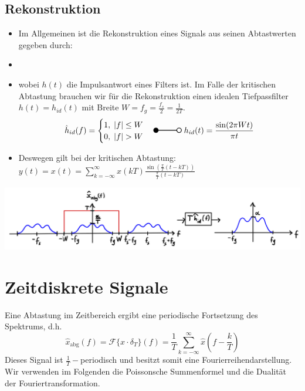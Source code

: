 \documentclass[11pt]{article}
\newcommand{\invtransform}[2]{%
    \begin{tikzpicture}
        \filldraw[thick] (0,0) circle (0.1);
        \draw[thick] (0.1,0) -- (#2 -0.1,0) node[midway, above] {#1};
        \draw[thick] (#2,0) circle (0.1);
    \end{tikzpicture}%
}
\begin{document}
\subsection*{Rekonstruktion}
\begin{itemize}[leftmargin=0pt]
    \item[] Im Allgemeinen ist die Rekonstruktion eines Signals aus seinen Abtastwerten gegeben durch:
    \item[] 
    \item[] wobei $h(t)$ die Impulsantwort eines Filters ist. Im Falle der kritischen Abtastung brauchen wir für die Rekonstruktion einen idealen Tiefpassfilter $h(t) = h_{id}(t)$ mit Breite $W = f_g = \frac{f_s}{2} = \frac{1}{2T}$.
    $$\hat{h}_{id}(f) = \displaystyle\begin{cases}
        1, \; |f| \leq W \\
        0, \; |f| > W
    \end{cases} \invtransform{}{1} \; h_{id}(t)=\displaystyle\frac{\sin(2 \pi W t)}{\pi t}$$
    \item[] Deswegen gilt bei der kritischen Abtastung: $y(t) = x(t) = \displaystyle\sum_{k=-\infty}^\infty x(kT)\displaystyle\frac{\sin\left(\frac{\pi}{T}(t-kT)\right)}{\frac{\pi}{T}(t-kT)}$
\end{itemize}
\vspace*{-0.75cm}
\begin{center}
    \includegraphics[width=\linewidth]{docimgs/filtering1.jpg}
\end{center}

\vfill \null
\pagebreak

\section*{Zeitdiskrete Signale}
\vspace*{-0.5cm}
Eine Abtastung im Zeitbereich ergibt eine periodische Fortsetzung des Spektrums, d.h.
$$\hat{x}_{\text{abg}}(f) = \mathcal{F}\{x \cdot \delta_T\}(f) = \frac{1}{T}\sum_{k=-\infty}^{\infty}\hat{x}\left( f- \frac{k}{T} \right)$$
Dieses Signal ist $\frac{1}{T}-$periodisch und besitzt somit eine Fourierreihendarstellung. Wir verwenden im Folgenden die Poissonsche Summenformel und die Dualität der Fouriertransformation.
\end{document}
